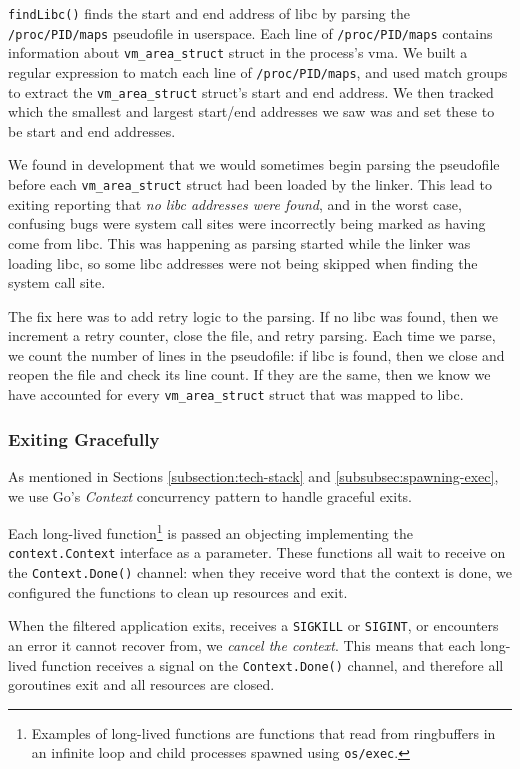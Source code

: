 \texttt{findLibc()} finds the start and end address of \ac{libc} by parsing the
\texttt{/proc/PID/maps} pseudofile in userspace. Each line of \texttt{/proc/PID/maps}
contains information about \texttt{vm\_area\_struct} struct in the process's \ac{vma}. We
built a regular expression to match each line of \texttt{/proc/PID/maps}, and
used match groups to extract the \texttt{vm\_area\_struct} struct's start and end address.
We then tracked which the smallest and largest start/end addresses we saw was
and set these to be  start and end addresses.

We found in development that we would sometimes begin parsing the pseudofile
before each \texttt{vm\_area\_struct} struct had been loaded by the linker. This lead to
\af exiting reporting that \textit{no \ac{libc} addresses were found}, and in
the worst case, confusing bugs were system call sites were incorrectly being marked as 
having come from \ac{libc}. This was happening as parsing started while the
linker was loading \ac{libc}, so some \ac{libc} addresses were not being skipped
when finding the system call site.

The fix here was to add retry logic to the parsing. If no \ac{libc} was found,
then we increment a retry counter, close the file, and retry parsing. Each time
we parse, we count the number of lines in the pseudofile: if \ac{libc} is found,
then we close and reopen the file and check its line count. If they are the
same, then we know we have accounted for every \texttt{vm\_area\_struct} struct that was
mapped to \ac{libc}.


\subsubsection{Exiting Gracefully}

As mentioned in Sections \ref{subsection:tech-stack} and 
\ref{subsubsec:spawning-exec}, we use Go's \textit{Context} concurrency pattern
to handle graceful exits. 

Each long-lived function\footnote{Examples of long-lived functions are functions
that read from ringbuffers in an infinite loop and child processes spawned using
\texttt{os/exec}.} is passed an objecting implementing the 
\texttt{context.Context} interface as a parameter. These functions all wait to
receive on the \texttt{Context.Done()} channel: when they receive word that the
context is done, we configured the functions to clean up resources and exit. 

When the filtered application exits, receives a \texttt{SIGKILL} or 
\texttt{SIGINT}, or \af encounters an error it cannot recover from, we 
\textit{cancel the context}. This means that each long-lived function receives 
a signal on the \texttt{Context.Done()} channel, and therefore all goroutines 
exit and all resources are closed.

